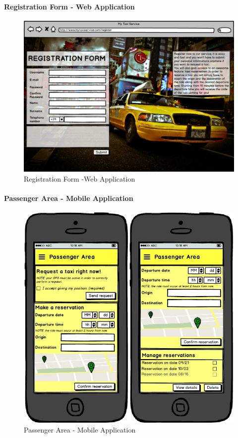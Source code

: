 		\paragraph{Registration Form - Web Application}
		\begin{figure}[!h]
			\begin{center}
				\includegraphics[scale=0.45]{../SE2_MOCKUPS/WebAppRegistrationForm.png}
				\caption{Registration Form -Web Application}	
			\end{center}
		\end{figure}
		\newpage
		\paragraph{Passenger Area - Mobile Application}
		\begin{figure}[!h]
			\begin{center}
				\includegraphics[scale=0.5]{../SE2_MOCKUPS/MobileAppPassengerArea.png}
				\caption{Passenger Area - Mobile Application}
			\end{center}	
		\end{figure}
		\newpage

